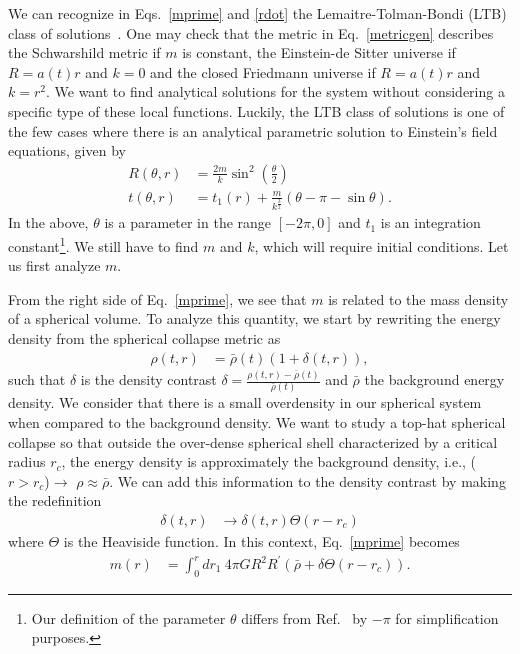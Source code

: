 \documentclass[a4paper,11pt]{article}
\begin{document}
We can recognize in Eqs.~\eqref{mprime} and \eqref{rdot} the Lemaitre-Tolman-Bondi (LTB)
class of solutions~\cite{Lemaitre1933}. One may check that the metric in
Eq.~\eqref{metricgen} describes the Schwarshild metric if $m$ is constant, the
Einstein-de Sitter universe if $R = a(t)r$ and $k=0$ and the closed Friedmann universe
if $R= a(t)r$ and $k = r^2$. We want to find analytical solutions for the system without
considering a specific type of these local functions. Luckily, the LTB class of
solutions is one of the few cases where there is an analytical parametric solution to
Einstein's field equations, given by
\begin{align}
	\label{ltb1}
	R(\theta, r) & = \frac{2m}{k}\sin^2\left(\frac{\theta}{2}\right)                          \\
	\label{ltb2}
	t(\theta, r) & = t_1(r) + \frac{m}{k^{\frac{3}{2}}}\left(\theta - \pi - \sin\theta\right)
	.\end{align}
In the above, $\theta$ is a parameter in the range $[-2\pi, 0]$ and $t_1$ is an
integration constant\footnote{Our definition of the parameter $\theta$ differs from
	Ref.~\cite{Martin2020} by $-\pi$ for simplification purposes.}. We still have to find
$m$ and $k$, which will require initial conditions. Let us first analyze $m$.

From the right side of Eq.~\eqref{mprime}, we see that $m$ is related to the mass
density of a spherical volume. To analyze this quantity, we start by rewriting the
energy density from the spherical collapse metric as
\begin{align}
	\rho(t, r) & = \bar{\rho}(t)(1 + \delta(t,r))
	,\end{align}
such that $\delta$ is the density contrast $\delta = \frac{\rho(t,r) -
		\bar{\rho}(t)}{\bar{\rho}(t)}$ and $\bar{\rho}$ the background energy density.  We
consider that there is a small overdensity in our spherical system when compared to the
background density. We want to study a top-hat spherical collapse so that outside the
over-dense spherical shell characterized by a critical radius $r_c$, the energy density
is approximately the background density, i.e., ($r > r_c$)$\rightarrow$ $\rho \approx
	\bar{\rho}$. We can add this information to the density contrast by making the
redefinition
\begin{align}
	\delta(t, r) & \rightarrow \delta(t, r) \Theta(r-r_c)
\end{align}
where $\Theta$ is the Heaviside function. In this context, Eq.~\eqref{mprime} becomes
\begin{align}
	m(r) & = \int_0^r dr_1~ 4\pi GR^2R^\prime \left(\bar{\rho} + \delta \Theta(r-r_c)\right)
	.\end{align}
\end{document}
